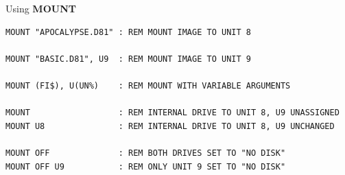 \begin{description}[leftmargin=2cm,style=nextline]
\item [Examples:] Using {\bf MOUNT}

\begin{tcolorbox}[colback=black,coltext=white]
\verbatimfont{\codefont}
\begin{verbatim}
MOUNT "APOCALYPSE.D81" : REM MOUNT IMAGE TO UNIT 8

MOUNT "BASIC.D81", U9  : REM MOUNT IMAGE TO UNIT 9

MOUNT (FI$), U(UN%)    : REM MOUNT WITH VARIABLE ARGUMENTS

MOUNT                  : REM INTERNAL DRIVE TO UNIT 8, U9 UNASSIGNED
MOUNT U8               : REM INTERNAL DRIVE TO UNIT 8, U9 UNCHANGED

MOUNT OFF              : REM BOTH DRIVES SET TO "NO DISK"
MOUNT OFF U9           : REM ONLY UNIT 9 SET TO "NO DISK"
\end{verbatim}
\end{tcolorbox}
\end{description}


\newpage
